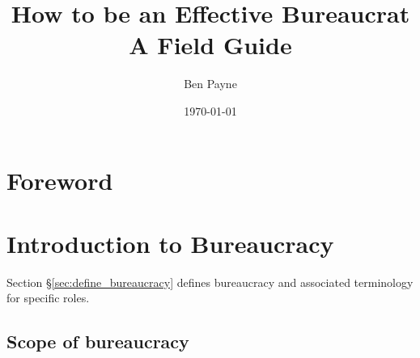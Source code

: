 \documentclass{book}
\title{How to be an Effective Bureaucrat\\
A Field Guide}
\author{Ben Payne}
\date{\today}
\begin{document}

\begin{titlepage}
\maketitle
\thispagestyle{empty}
\end{titlepage}
\newpage

\frontmatter %

\clearpage

\chapter*{Foreword}%

\hypertarget{contents}{}
\tableofcontents

\mainmatter %


\chapter{Introduction to Bureaucracy}

Section \S\ref{sec:define_bureaucracy} defines bureaucracy and associated terminology for specific roles.

  \newpage %
  
  \newpage %


    
    
    
     
  \newpage
  \newpage %
  \section{Scope of bureaucracy}
\end{document}
